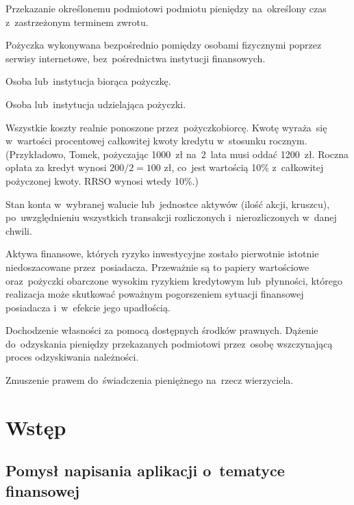 \documentclass[a4paper,twoside,titlepage,openright]{book}
\begin{document}
\begin{description}[style=nextline]
	\item[Pożyczka] Przekazanie określonemu podmiotowi podmiotu pieniędzy na~określony czas z~zastrzeżonym terminem zwrotu. 
	\item[Pożyczka społecznościowa (ang. \textit{social lending})] Pożyczka wykonywana bezpośrednio pomiędzy osobami fizycznymi poprzez serwisy internetowe, bez~pośrednictwa instytucji finansowych.
	\item[Pożyczkobiorca] Osoba lub~instytucja biorąca pożyczkę.\cite{slownikPwn}
	\item[Pożyczkodawca] Osoba lub~instytucja udzielająca pożyczki.\cite{slownikPwn}
	\item[RRSO (Rzeczywista roczna stopa oprocentowania)] Wszystkie koszty realnie ponoszone przez~pożyczkobiorcę. Kwotę wyraża~się w~wartości procentowej całkowitej kwoty kredytu w~stosunku rocznym. (Przykładowo, Tomek, pożyczając 1000~zł na~2~lata musi oddać 1200~zł. Roczna opłata za kredyt wynosi $ 200 / 2 = 100 \text{ zł} $, co~jest wartością 10\% z~całkowitej pożyczonej kwoty. RRSO wynosi wtedy 10\%.)
	\item[Saldo] Stan konta w~wybranej walucie lub~jednostce aktywów (ilość akcji, kruszcu), po~uwzględnieniu wszystkich transakcji rozliczonych i~nierozliczonych w~danej chwili.
	\item[Toksyczne aktywa] Aktywa finansowe, których ryzyko inwestycyjne zostało pierwotnie istotnie niedoszacowane przez~posiadacza. Przeważnie są to papiery wartościowe oraz~pożyczki obarczone wysokim ryzykiem kredytowym lub~płynności, którego realizacja może skutkować poważnym pogorszeniem sytuacji finansowej posiadacza i~w~efekcie jego upadłością.\cite{slownikNBP}
	\item[Windykacja] Dochodzenie własności za pomocą dostępnych środków prawnych. Dążenie do~odzyskania pieniędzy przekazanych podmiotowi przez~osobę wszczynającą proces odzyskiwania należności.
	\item[Zobowiązania] Zmuszenie prawem do~świadczenia pieniężnego na~rzecz wierzyciela.
\end{description}

\chapter*{Wstęp}

\section*{Pomysł napisania aplikacji o~tematyce finansowej}
\end{document}
